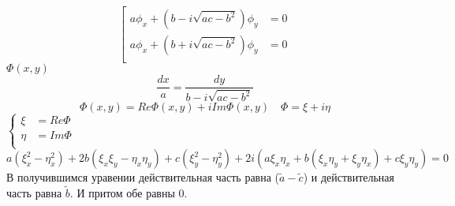 \documentclass[a4paper]{article}
\begin{document}
\begin{equation}
   \left[
       \begin{array}{ll}
           a\phi_x + (b - i\sqrt{ac - b^2})\phi_y &= 0 \\
           a\phi_x + (b + i\sqrt{ac - b^2})\phi_y &= 0 \\
       \end{array}
   \right .
\end{equation}
$ \Phi(x,y) $
\[ \frac{dx}{a} = \frac{dy}{b-i\sqrt{ac-b^2}} \]
\[ \Phi(x,y) = Re\Phi(x,y) + iIm\Phi(x,y) \quad \Phi = \xi + i \eta \]
$
\begin{cases}
    \xi &= Re\Phi \\
    \eta &= Im\Phi \\
\end{cases}
$
\[
    a(\xi_x^2 - \eta_x^2) + 2b(\xi_x\xi_y - \eta_x\eta_y) + c(\xi_y^2 - \eta_y^2)
    + 2i(a\xi_x\eta_x + b(\xi_x\eta_y + \xi_y\eta_x) + c\xi_y\eta_y) = 0
\]
В получившимся уравении действительная часть равна ($\tilde{a} - \tilde{c}$)
и действительная часть равна $\tilde{b}$. И притом обе равны 0.
\end{document}
